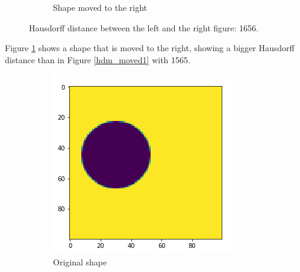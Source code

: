 \begin{figure}[H]
\begin{subfigure}{.35\textwidth}
        \caption{Shape moved to the right}
    \end{subfigure}
    \caption{Hausdorff distance between the left and the right figure: 1656. }
    \label{hdm_moved2}
\end{figure}

Figure \ref{hdm_moved2} shows a shape that is moved to the right, showing a bigger Hausdorff distance than in Figure \ref{hdm_moved1} with 1565.

\begin{figure}[H]
    \centering
    \begin{subfigure}{.35\textwidth}
        \centering
        \includegraphics[width=\linewidth]{chapters/06_hdm/images/hdm_original.png}
        \caption{Original shape}
    \end{subfigure}%
    \begin{subfigure}{.35\textwidth}
        \centering

\end{subfigure}
\end{figure}
